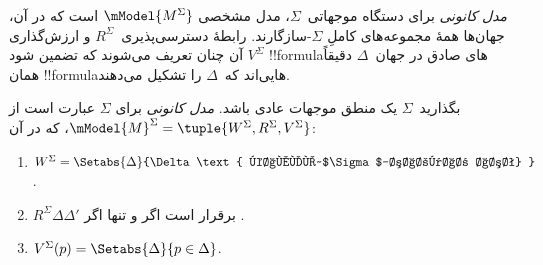 \documentclass[../../../include/open-logic-section]{subfiles}
\begin{document}


\emph{مدل کانونی} برای دستگاه موجهاتی~$\Sigma$، مدل مشخصی
$\mModel{M^\Sigma}$ است که در آن، جهان‌ها همهٔ مجموعه‌های کاملِ
$\Sigma$-سازگارند. رابطهٔ دسترسی‌پذیری~$R^\Sigma$ و ارزش‌گذاری
$V^\Sigma$ آن چنان تعریف می‌شوند که تضمین شود !!{formula}های صادق در
جهان~$\Delta$ دقیقاً همان !!{formula}هایی‌اند که~$\Delta$ را تشکیل می‌دهند.

\begin{defn}
  بگذارید~$\Sigma$ یک منطق موجهات عادی باشد. \emph{مدل کانونی} برای
  $\Sigma$ عبارت است از $\mModel{M}^\Sigma = \tuple{W^\Sigma, R^\Sigma,
    V^\Sigma}$، که در آن:
  \begin{enumerate}
  \item $W^\Sigma = \Setabs{ \Delta }{\Delta \text{
      کاملِ~$\Sigma$-سازگار است} }$.
  \item $R^\Sigma \Delta\Delta'$ برقرار است اگر و تنها اگر
    .
  \item $V^\Sigma(p) = \Setabs{\Delta}{p \in \Delta}$.
  \end{enumerate}
\end{defn}
\end{document}
